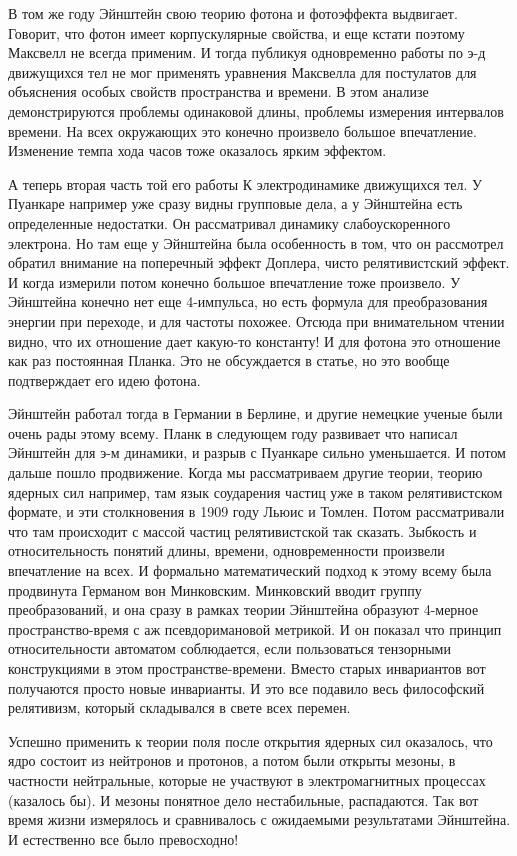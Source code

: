 \documentclass[a4paper, 12pt]{article}
\begin{document}
В том же году Эйнштейн свою теорию фотона и фотоэффекта выдвигает. 
Говорит, что фотон имеет корпускулярные свойства, и еще кстати поэтому 
Максвелл не всегда применим. И тогда публикуя одновременно работы по э-д 
движущихся тел не мог применять уравнения Максвелла для постулатов для 
объяснения особых свойств пространства и времени. В этом анализе 
демонстрируются проблемы одинаковой длины, проблемы измерения интервалов 
времени. На всех окружающих это конечно произвело большое впечатление. 
Изменение темпа хода часов тоже оказалось ярким эффектом.

А теперь вторая часть той его работы К электродинамике движущихся тел. 
У Пуанкаре например уже сразу видны групповые дела, а у Эйнштейна есть 
определенные недостатки. Он рассматривал динамику слабоускоренного 
электрона. Но там еще у Эйнштейна была особенность в том, что он 
рассмотрел обратил внимание на поперечный эффект Доплера, чисто 
релятивистский эффект. И когда измерили потом конечно большое 
впечатление тоже произвело. У Эйнштейна конечно нет еще 4-импульса, но 
есть формула для преобразования энергии при переходе, и для частоты 
похожее. Отсюда при внимательном чтении видно, что их отношение дает 
какую-то константу! И для фотона это отношение как раз постоянная 
Планка. Это не обсуждается в статье, но это вообще подтверждает его идею 
фотона.

Эйнштейн работал тогда в Германии в Берлине, и другие немецкие ученые 
были очень рады этому всему. Планк в следующем году развивает что 
написал Эйнштейн для э-м динамики, и разрыв с Пуанкаре сильно 
уменьшается. И потом дальше пошло продвижение. Когда мы рассматриваем 
другие теории, теорию ядерных сил например, там язык соударения частиц 
уже в таком релятивистском формате, и эти столкновения в 1909 году Льюис 
и Томлен. Потом рассматривали что там происходит с массой частиц 
релятивистской так сказать. Зыбкость и относительность понятий длины, 
времени, одновременности произвели впечатление на всех. И формально 
математический подход к этому всему была продвинута Германом вон 
Минковским. Минковский вводит группу преобразований, и она сразу 
в рамках теории Эйнштейна образуют 4-мерное пространство-время с аж 
псевдоримановой метрикой. И он показал что принцип относительности 
автоматом соблюдается, если пользоваться тензорными конструкциями в этом 
пространстве-времени. Вместо старых инвариантов вот получаются просто 
новые инварианты. И это все подавило весь философский релятивизм, 
который складывался в свете всех перемен.

Успешно применить к теории поля после открытия ядерных сил оказалось, 
что ядро состоит из нейтронов и протонов, а потом были открыты мезоны, 
в частности нейтральные, которые не участвуют в электромагнитных 
процессах (казалось бы). И мезоны понятное дело нестабильные, 
распадаются. Так вот время жизни измерялось и сравнивалось с ожидаемыми 
результатами Эйнштейна. И естественно все было превосходно!
\end{document}
